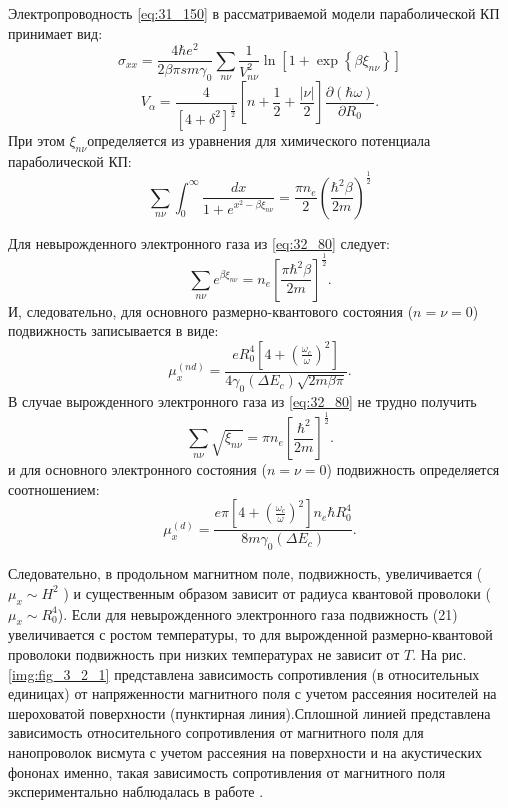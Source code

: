 Электропроводность \eqref{eq:31_150} в рассматриваемой модели параболической КП принимает вид:
\begin{equation} \label{eq:32_70}
\sigma _{xx} =\frac{4\hbar e^{2} }{2\beta \pi sm\gamma _{0} } \sum _{n\nu }\frac{1}{V_{n\nu }^{2} } \ln \left[1+\exp \left\{\beta \xi _{n\nu } \right\}\right]
\end{equation}
\[
V_{\alpha } =\frac{4}{\left[4+\delta ^{2} \right]^{\frac{1}{2} } } \left[n+\frac{1}{2} +\frac{\left|\nu \right|}{2} \right]\frac{\partial (\hbar \omega )}{\partial R_{0} } .
\] 
При этом $\xi _{n\nu } $определяется из уравнения для химического потенциала параболической КП:
\begin{equation} \label{eq:32_80}
\sum _{n\nu }\int _{0}^{\infty }\frac{dx}{1+e^{x^{2} -\beta \xi _{n\nu } } } =\frac{\pi n_{e} }{2} \left(\frac{\hbar ^{2} \beta }{2m} \right)^{\frac{1}{2} } 
\end{equation}

Для невырожденного электронного газа из \eqref{eq:32_80} следует:
\[
\sum _{n\nu }e^{\beta \xi _{n\nu } }  =n_{e} \left[\frac{\pi \hbar ^{2} \beta }{2m} \right]^{\frac{1}{2} } .
\] 
И, следовательно, для основного размерно-квантового состояния ($n=\nu =0$) подвижность записывается в виде:
\begin{equation} \label{eq:32_90}
\mu _{x}^{\left(nd\right)} =\frac{eR_{0}^{4} \left[4+\left(\frac{\omega _{c} }{\omega } \right)^{2} \right]}{4\gamma _{0} \left(\Delta E_{c} \right)\sqrt{2m\beta \pi } } . 
\end{equation}
В случае вырожденного электронного газа из \eqref{eq:32_80} не трудно получить
\[
\sum _{n\nu }\sqrt{\xi _{n\nu } }  =\pi n_{e} \left[\frac{\hbar ^{2} }{2m} \right]^{\frac{1}{2} } .
\] 
и для основного электронного состояния ($n=\nu =0$) подвижность определяется соотношением:
\begin{equation} \label{eq:32_100}
\mu _{x}^{\left(d\right)} =\frac{e\pi \left[4+\left(\frac{\omega _{c} }{\omega } \right)^{2} \right]n_{e} \hbar R_{0}^{4} }{8m\gamma _{0} \left(\Delta E_{c} \right)} .
\end{equation}
 
Следовательно, в продольном магнитном поле, подвижность, увеличивается ($\mu _{x} \sim H^{2} $ ) и существенным образом зависит от радиуса квантовой проволоки ($\mu _{x} \sim R_{0}^{4} $). Если для невырожденного электронного газа  подвижность (21) увеличивается с ростом температуры, то для вырожденной размерно-квантовой проволоки подвижность при низких температурах не зависит от $T$. На рис. \ref{img:fig_3_2_1} представлена зависимость сопротивления (в относительных единицах) от напряженности магнитного поля с учетом рассеяния носителей на шероховатой поверхности (пунктирная линия).Сплошной линией представлена зависимость относительного сопротивления от магнитного поля для нанопроволок висмута с учетом рассеяния на поверхности и на акустических фононах именно, такая зависимость сопротивления от магнитного поля экспериментально наблюдалась в работе \cite{Nikolaeva2004}.


